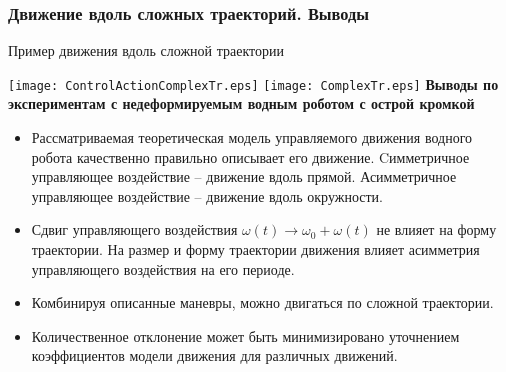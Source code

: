 %



%

\begin{frame}
\frametitle{Движение вдоль сложных траекторий. Выводы}

Пример движения вдоль сложной траектории

{
	\centering
	\texttt{[image: ControlActionComplexTr.eps]} \hspace{5mm}
	\texttt{[image: ComplexTr.eps]}
}
\textbf{Выводы по экспериментам с недеформируемым водным роботом с острой кромкой}
\begin{itemize}
	\item Рассматриваемая теоретическая модель управляемого движения водного робота качественно правильно описывает его движение. Cимметричное управляющее воздействие -- движение вдоль прямой. Асимметричное управляющее воздействие -- движение вдоль окружности.
	
	\item Сдвиг управляющего воздействия $\omega(t) \rightarrow \omega_0 + \omega(t)$ не влияет на форму траектории. На размер и форму траектории движения влияет асимметрия управляющего воздействия на его периоде.
	
	\item Комбинируя описанные маневры, можно двигаться по сложной траектории.
	
	\item Количественное отклонение может быть минимизировано уточнением коэффициентов модели движения для различных движений.
	
\end{itemize}

\end{frame}

